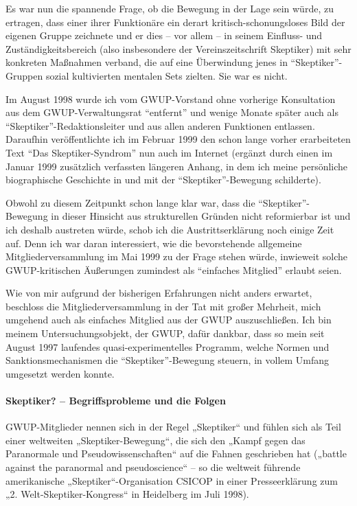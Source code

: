 Es war nun die spannende Frage, ob die Bewegung in der Lage sein würde,
zu ertragen, dass einer ihrer Funktionäre ein derart
kritisch-schonungsloses Bild der eigenen Gruppe zeichnete und er dies --
vor allem -- in seinem Einfluss- und Zuständigkeitsbereich (also
insbesondere der Vereinszeitschrift Skeptiker) mit sehr konkreten
Maßnahmen verband, die auf eine Überwindung jenes in
``Skeptiker''-Gruppen sozial kultivierten mentalen Sets zielten. Sie war
es nicht.

Im August 1998 wurde ich vom GWUP-Vorstand ohne vorherige Konsultation
aus dem GWUP-Verwaltungsrat ``entfernt'' und wenige Monate später auch
als ``Skeptiker''-Redaktionsleiter und aus allen anderen Funktionen
entlassen. Daraufhin veröffentlichte ich im Februar 1999 den schon lange
vorher erarbeiteten Text ``Das Skeptiker-Syndrom'' nun auch im Internet
(ergänzt durch einen im Januar 1999 zusätzlich verfassten längeren
Anhang, in dem ich meine persönliche biographische Geschichte in und mit
der ``Skeptiker''-Bewegung schilderte).

Obwohl zu diesem Zeitpunkt schon lange klar war, dass die
``Skeptiker''-Bewegung in dieser Hinsicht aus strukturellen Gründen
nicht reformierbar ist und ich deshalb austreten würde, schob ich die
Austrittserklärung noch einige Zeit auf. Denn ich war daran
interessiert, wie die bevorstehende allgemeine Mitgliederversammlung im
Mai 1999 zu der Frage stehen würde, inwieweit solche GWUP-kritischen
Äußerungen zumindest als ``einfaches Mitglied'' erlaubt seien.

Wie von mir aufgrund der bisherigen Erfahrungen nicht anders erwartet,
beschloss die Mitgliederversammlung in der Tat mit großer Mehrheit, mich
umgehend auch als einfaches Mitglied aus der GWUP auszuschließen. Ich
bin meinem Untersuchungsobjekt, der GWUP, dafür dankbar, dass so mein
seit August 1997 laufendes quasi-experimentelles Programm, welche Normen
und Sanktions­mechanismen die ``Skeptiker''-Bewegung steuern, in vollem
Umfang umgesetzt werden konnte.

\hypertarget{skeptiker--begriffsprobleme-und-die-folgen}{%
\paragraph{Skeptiker? -- Begriffsprobleme und die
Folgen}\label{skeptiker--begriffsprobleme-und-die-folgen}}

GWUP-Mitglieder nennen sich in der Regel „Skeptiker`` und fühlen sich
als Teil einer weltweiten „Skeptiker-Bewegung``, die sich den „Kampf
gegen das Paranormale und Pseudowissenschaften`` auf die Fahnen
geschrieben hat („battle against the paranormal and pseudoscience`` --
so die weltweit führende amerikanische „Skeptiker``-Organisation CSICOP
in einer Presseerklärung zum „2. Welt-Skeptiker-Kongress`` in Heidelberg
im Juli 1998).

